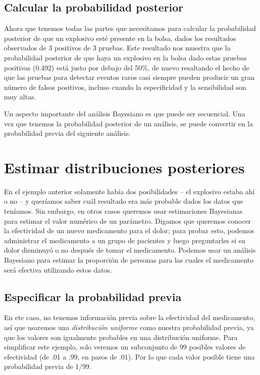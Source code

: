 \documentclass[
  12pt,
]{book}
\begin{document}
\hypertarget{calcular-la-probabilidad-posterior}{%
\subsection{Calcular la probabilidad posterior}\label{calcular-la-probabilidad-posterior}}

Ahora que tenemos todas las partes que necesitamos para calcular la probabilidad posterior de que un explosivo esté presente en la bolsa, dados los resultados observados de 3 positivos de 3 pruebas.
Este resultado nos muestra que la probabilidad posterior de que haya un explosivo en la bolsa dado estas pruebas positivas (0.492) está justo por debajo del 50\%, de nuevo resaltando el hecho de que las pruebas para detectar eventos raros casi siempre pueden producir un gran número de falsos positivos, incluso cuando la especificidad y la sensibilidad son muy altas.

Un aspecto importante del análisis Bayesiano es que puede ser secuencial. Una vez que tenemos la probabilidad posterior de un análisis, se puede convertir en la probabilidad previa del siguiente análisis.

\hypertarget{estimating-posterior-distributions}{%
\section{Estimar distribuciones posteriores}\label{estimating-posterior-distributions}}

En el ejemplo anterior solamente había dos posibilidades -- el explosivo estaba ahí o no -- y queríamos saber cuál resultado era más probable dados los datos que teníamos. Sin embargo, en otros casos queremos usar estimaciones Bayesianas para estimar el valor numérico de un parámetro. Digamos que queremos conocer la efectividad de un nuevo medicamento para el dolor; para probar esto, podemos administrar el medicamento a un grupo de pacientes y luego preguntarles si su dolor disminuyó o no después de tomar el medicamento. Podemos usar un análisis Bayesiano para estimar la proporción de personas para las cuales el medicamento será efectiva utilizando estos datos.

\hypertarget{especificar-la-probabilidad-previa-1}{%
\subsection{Especificar la probabilidad previa}\label{especificar-la-probabilidad-previa-1}}

En ete caso, no tenemos información previa sobre la efectividad del medicamento, así que usaremos una \emph{distribución uniforme} como nuestra probabilidad previa, ya que los valores son igualmente probables en una distribución uniforme. Para simplificar este ejemplo, solo veremos un subconjunto de 99 posibles valores de efectividad (de .01 a .99, en pasos de .01). Por lo que cada valor posible tiene una probabilidad previa de 1/99.
\end{document}
